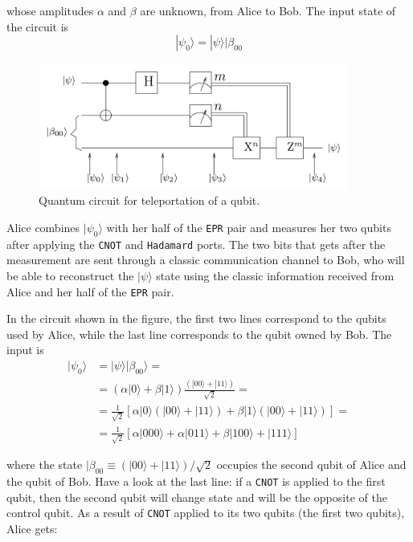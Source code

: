 \documentclass[a4paper,10pt]{article}
\begin{document}
whose amplitudes $\alpha$ and $\beta$ are unknown, from Alice to Bob. The input state of the circuit is
$$|\psi_0\rangle = |\psi\rangle|\beta_{00}$$

\begin{figure}[!htb]
\begin{center}
\includegraphics[width=4.0in]{images/quantumTeletrasportation.png}
\caption{Quantum circuit for teleportation of a qubit.}
\label{quantumTeletrasportation}
\end{center}
\end{figure}

Alice combines $|\psi_0\rangle$ with her half of the \texttt{EPR} pair and measures her two qubits after applying the \texttt{CNOT} and \texttt{Hadamard} ports. The two bits that gets after the measurement are sent through a classic communication channel to Bob, who will be able to reconstruct the $|\psi\rangle$ state using the classic information received from Alice and her half of the \texttt{EPR} pair.

In the circuit shown in the figure, the first two lines correspond to the qubits used by Alice, while the last line corresponds to the qubit owned by Bob. The input is
\begin{equation*}
\begin{split}
|\psi_0\rangle & = |\psi\rangle |\beta_{00}\rangle = \\  & = (\alpha|0\rangle + \beta|1\rangle) \frac{(|00\rangle + |11\rangle)}{\sqrt{2}} = \\
 & = \frac{1}{\sqrt{2}}\left[\alpha|0\rangle \left(|00\rangle + |11\rangle\right) + \beta|1\rangle \left(|00\rangle + |11\rangle\right) \right] = \\
 & = \frac{1}{\sqrt{2}}\left[\alpha|000\rangle + \alpha|011\rangle + \beta|100\rangle + |111\rangle\right]
\end{split}
\end{equation*}

where the state $|\beta_{00} \equiv (|00\rangle + |11\rangle) / \sqrt{2}$ occupies the second qubit of Alice and the qubit of Bob. Have a look at the last line: if a \texttt{CNOT} is applied to the first qubit, then the second qubit will change state and will be the opposite of the control qubit. As a result of \texttt{CNOT} applied to its two qubits (the first two qubits), Alice gets:
\end{document}
